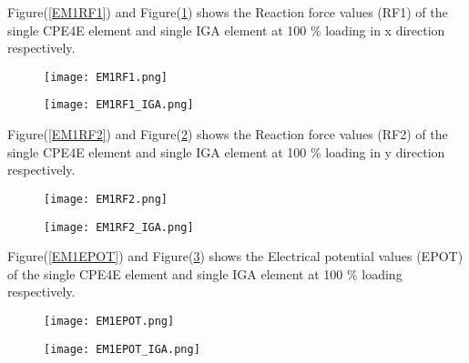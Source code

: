 \documentclass[11pt]{article}
\begin{document}
Figure(\ref{EM1RF1}) and Figure(\ref{EM1RF1_IGA}) shows the Reaction force values (RF1) of the single CPE4E element and single IGA element at 100 \% loading in x direction respectively. \\
\begin{figure}[H]
	\centering
	\begin{minipage}{.5\textwidth}
		\centering
		\texttt{[image: EM1RF1.png]}
		\label{EM1RF1}
	\end{minipage}%
	\begin{minipage}{.5\textwidth}
		\centering
		\texttt{[image: EM1RF1\_IGA.png]}
		\label{EM1RF1_IGA}
	\end{minipage}
\end{figure}
Figure(\ref{EM1RF2}) and Figure(\ref{EM1RF2_IGA}) shows the Reaction force values (RF2) of the single CPE4E element and single IGA element at 100 \% loading in y direction respectively. \\
\begin{figure}[H]
	\centering
	\begin{minipage}{.5\textwidth}
		\centering
		\texttt{[image: EM1RF2.png]}
		\label{EM1RF2}
	\end{minipage}%
	\begin{minipage}{.5\textwidth}
		\centering
		\texttt{[image: EM1RF2\_IGA.png]}
		\label{EM1RF2_IGA}
	\end{minipage}
\end{figure}



Figure(\ref{EM1EPOT}) and Figure(\ref{EM1EPOT_IGA}) shows the Electrical potential values (EPOT) of the single CPE4E element and single IGA element at 100 \% loading respectively. \\
\begin{figure}[H]
	\centering
	\begin{minipage}{.5\textwidth}
		\centering
		\texttt{[image: EM1EPOT.png]}
		\label{EM1EPOT}
	\end{minipage}%
	\begin{minipage}{.5\textwidth}
		\centering
		\texttt{[image: EM1EPOT\_IGA.png]}
		\label{EM1EPOT_IGA}
	\end{minipage}
\end{figure}
\end{document}
